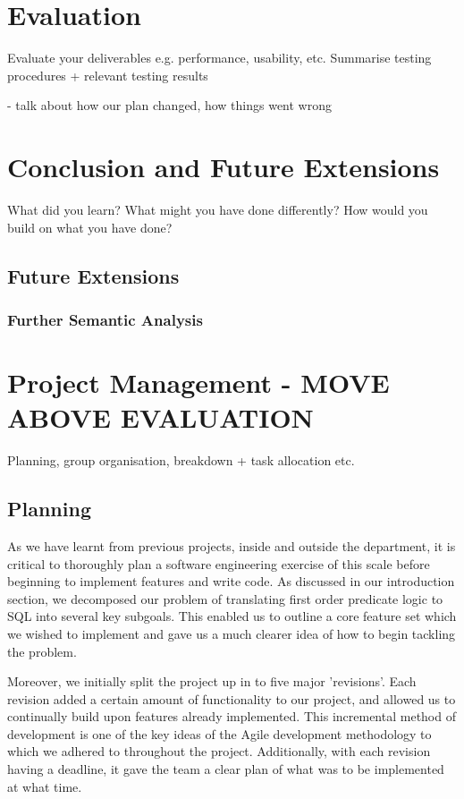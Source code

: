 \documentclass[a4paper, 11pt]{article}
\begin{document}
\section{Evaluation}
  Evaluate your deliverables e.g. performance, usability, etc.
  Summarise testing procedures + relevant testing results

  - talk about how our plan changed, how things went wrong

\section{Conclusion and Future Extensions}
  What did you learn? What might you have done differently?
  How would you build on what you have done?

  \subsection{Future Extensions}

    \subsubsection{Further Semantic Analysis}

\section{Project Management - MOVE ABOVE EVALUATION}
  Planning, group organisation, breakdown + task allocation etc.

  \subsection{Planning}

    As we have learnt from previous projects, inside and outside the
    department, it is critical to thoroughly plan a software engineering
    exercise of this scale before beginning to implement features and write
    code. As discussed in our introduction section, we decomposed our problem
    of translating first order predicate logic to SQL into several key
    subgoals. This enabled us to outline a core feature set which we wished to
    implement and gave us a much clearer idea of how to begin tackling the
    problem.

    Moreover, we initially split the project up in to five major 'revisions'.
    Each revision added a certain amount of functionality to our project, and
    allowed us to continually build upon features already implemented. This
    incremental method of development is one of the key ideas of the Agile
    development methodology to which we adhered to throughout the project.
     Additionally, with each revision having a
    deadline, it gave the team a clear plan of what was to be implemented at
    what time.
\end{document}
